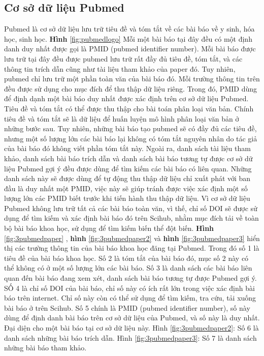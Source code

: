 \documentclass[../DoAn.tex]{subfiles}
\begin{document}
\subsection{Cơ sở dữ liệu Pubmed}
Pubmed là cơ sở dữ liệu lưu trữ tiêu đề và tóm tắt về các bài báo về y sinh, hóa học, sinh học. \textbf{Hình} \ref{fig:pubmedlogo} Mỗi một bài báo tại đây đều có một định danh duy nhất được gọi là PMID (pubmed identifier number). Mỗi bài báo được lưu trữ tại đây đều được pubmed lưu trữ rất đầy đủ tiêu đề, tóm tắt, và các thông tin trích dẫn cũng như tài liệu tham khảo của paper đó. Tuy nhiên, pubmed chỉ lưu trữ một phần toàn văn của bài báo đó. Mỗi trường thông tin trên đều được sử dụng cho mục đích để thu thập dữ liệu riêng. Trong đó, PMID dùng để định dạnh một bài báo duy nhất được xác định trên cơ sở dữ liệu Pubmed. Tiêu đề và tóm tắt có thể được thu thập cho bài toán phân loại văn bản. Chính tiêu đề và tóm tắt sẽ là dữ liệu để huấn luyện mô hình phân loại văn bản ở những bước sau. Tuy nhiên, những bài báo tạo pubmed sẽ có đầy đủ các tiêu đề, nhưng một số lượng lớn các bài báo lại không có tóm tắt nguyên nhân do tác giả của bài báo đó không viết phần tóm tắt này. Ngoài ra, danh sách tài liệu tham khảo, danh sách bài báo trích dẫn và danh sách bài báo tương tự được cơ sở dữ liệu Pubmed gợi ý đều được dùng để tìm kiếm các bài báo có liên quan. Những danh sách này sẽ được dùng để tự động thu thập dữ liệu chỉ xuất phát với ban đầu là duy nhất một PMID, việc này sẽ giúp tránh được việc xác định một số lượng lớn các PMID biết trước khi tiến hành thu thập dữ liệu. Vì cơ sở dữ liệu Pubmed không lưu trữ tất cả các bài báo toàn văn, vì thế, chỉ số DOI sẽ được sử dụng để tìm kiếm và xác định bài báo đó trên Scihub, nhằm mục đích tải về toàn bộ bài báo khoa học, sử dụng để tìm kiếm biến thể đột biến. \textbf{Hình} \ref{fig:3pubmedpaper} , \textbf{hình} \ref{fig:3pubmedpaper2} và \textbf{hình} \ref{fig:3pubmedpaper3} hiển thị các trường thông tin của bài báo khoa học đăng tại Pubmed. Trong đó số 1 là tiêu đề của bài báo khoa học. Số 2 là tóm tắt của bài báo đó, mục số 2 này có thể không có ở một số lượng lớn các bài báo. Số 3 là danh sách các bài báo liên quan đến bài báo đang xem xét, danh sách bài báo tương tự được Pubmed gợi ý. SỐ 4 là chỉ số DOI của bài báo, chỉ số này có ích rất lớn trong việc xác định bài báo trên internet. Chỉ số này còn có thể sử dụng để tìm kiếm, tra cứu, tải xuống bài báo ở trên Scihub. Số 5 chính là PMID (pubmed identifier number), số này dùng để định danh bài báo trên cơ sở dữ liệu của Pubmed, và số này là duy nhất. Đại diện cho một bài báo tại cơ sở dữ liệu này. Hình \ref{fig:3pubmedpaper2}: Số 6 là danh sách những bài báo trích dẫn. Hình \ref{fig:3pubmedpaper3}: Số 7 là danh sách những bài báo tham khảo.
\end{document}
